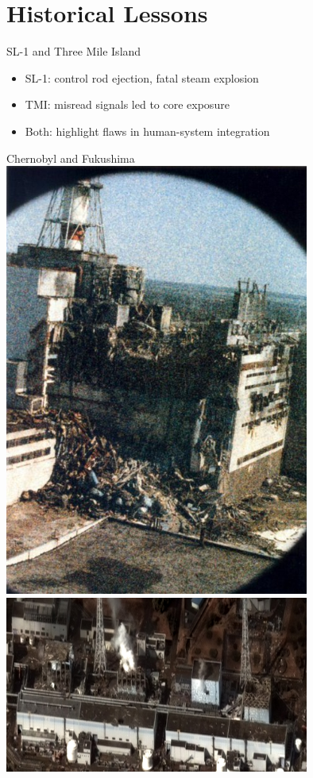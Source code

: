 \documentclass{beamer}
\begin{document}
\section{Historical Lessons}

\begin{frame}{SL-1 and Three Mile Island}
  \begin{itemize}
    \item SL-1: control rod ejection, fatal steam explosion
    \item TMI: misread signals led to core exposure
    \item Both: highlight flaws in human-system integration
  \end{itemize}
\end{frame}

\begin{frame}{Chernobyl and Fukushima}
  \includegraphics[width=0.75\textwidth]{images/chernobylafter.jpg}
  \includegraphics[width=0.75\textwidth]{images/fukushimaafter.jpg}
\end{frame}
\end{document}
